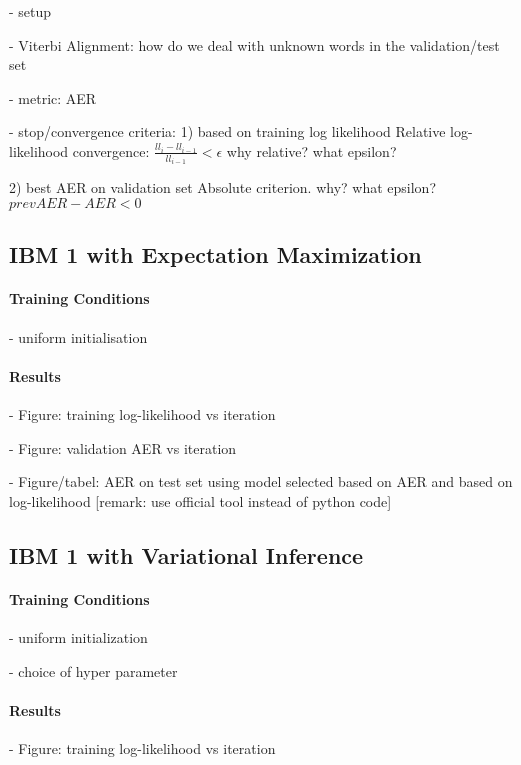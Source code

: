 \documentclass[11pt,a4paper]{article}
\begin{document}
- setup

- Viterbi Alignment: how do we deal with unknown words in the validation/test set

- metric: AER

- stop/convergence criteria:
1) based on training log likelihood
Relative log-likelihood convergence: 
$\frac{ll_i - ll_{i-1}}{ll_{i-1}} < \epsilon$
why relative? what epsilon?

2) best AER on validation set
Absolute criterion. why? what epsilon?
$prevAER - AER < 0$

\subsection{IBM 1 with Expectation Maximization}
\label{IBM1}


\paragraph{Training Conditions}

- uniform initialisation

\paragraph{Results}

- Figure: training log-likelihood vs iteration

- Figure: validation AER vs iteration

- Figure/tabel: AER on test set using model selected based on AER and based on log-likelihood [remark: use official tool instead of python code]  


\subsection{IBM 1 with Variational Inference}
\label{IBM1_Dirichlet}


\paragraph{Training Conditions}

- uniform initialization

- choice of hyper parameter

\paragraph{Results}

- Figure: training log-likelihood vs iteration
\end{document}
